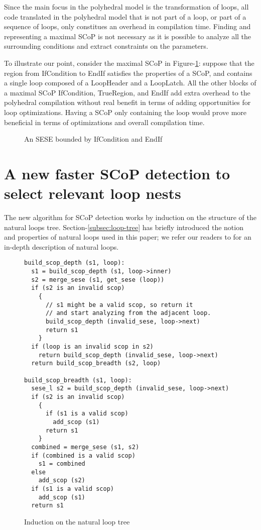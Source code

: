 \documentclass{sigplanconf}
\begin{document}
Since the main focus in the polyhedral model is the transformation of loops, all
code translated in the polyhedral model that is not part of a loop, or part of a
sequence of loops, only constitues an overhead in compilation time.  Finding and
representing a maximal SCoP is not necessary as it is possible to analyze all
the surrounding conditions and extract constraints on the parameters.

To illustrate our point, consider the maximal SCoP in
Figure-\ref{fig:maximality}: suppose that the region from IfCondition to EndIf
satisfies the properties of a SCoP, and contains a single loop composed of a
LoopHeader and a LoopLatch.  All the other blocks of a maximal SCoP
IfCondition, TrueRegion, and EndIf add extra overhead to the polyhedral
compilation without real benefit in terms of adding opportunities for loop
optimizations.  Having a SCoP only containing the loop would prove more
beneficial in terms of optimizations and overall compilation time.

\begin{figure}
\centering
\caption{An SESE bounded by IfCondition and EndIf}
\label{fig:maximality}
\end{figure}

\section{A new faster SCoP detection to select relevant loop nests}
\label{sec:new-scop-detection}
The new algorithm for SCoP detection works by induction on the structure of the
natural loops tree.  Section-\ref{subsec:loop-tree} has briefly introduced
the notion and properties of natural loops used in this paper; we refer our
readers to \cite{dragonbook} for an in-depth description of natural loops.

\begin{figure}
\begin{verbatim}
build_scop_depth (s1, loop):
  s1 = build_scop_depth (s1, loop->inner)
  s2 = merge_sese (s1, get_sese (loop))
  if (s2 is an invalid scop)
    {
      // s1 might be a valid scop, so return it
      // and start analyzing from the adjacent loop.
      build_scop_depth (invalid_sese, loop->next)
      return s1
    }
  if (loop is an invalid scop in s2)
    return build_scop_depth (invalid_sese, loop->next)
  return build_scop_breadth (s2, loop)

build_scop_breadth (s1, loop):
  sese_l s2 = build_scop_depth (invalid_sese, loop->next)
  if (s2 is an invalid scop)
    {
      if (s1 is a valid scop)
        add_scop (s1)
      return s1
    }
  combined = merge_sese (s1, s2)
  if (combined is a valid scop)
    s1 = combined
  else
    add_scop (s2)
  if (s1 is a valid scop)
    add_scop (s1)
  return s1
\end{verbatim}
\caption{Induction on the natural loop tree}
\label{fig:induction}
\end{figure}
\end{document}
